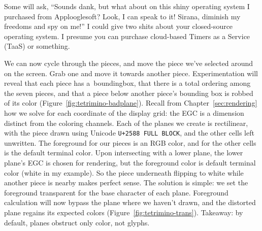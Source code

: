 Some will ask, ``Sounds dank, but what about on this shiny operating system I
purchased from Applooglesoft? Look, I can speak to it! Sirana, diminish my
freedoms and spy on me!'' I could give two shits about your closed-source
operating system. I presume you can purchase cloud-based Timers as a Service
(TaaS) or something.

We can now cycle through the pieces, and move the piece we've selected around
on the screen. Grab one and move it towards another piece. Experimentation will
reveal that each piece has a~\gls{boundingbox}, that there is a total ordering
among the seven pieces, and that a piece below another piece's bounding box is
robbed of its color (Figure~\ref{fig:tetrimino-badplane}). Recall from
Chapter~\ref{sec:rendering} how we solve for each coordinate of the display
grid: the EGC is a dimension distinct from the coloring channels. Each of the
planes we create is rectilinear, with the piece drawn using Unicode
\texttt{U+2588 FULL BLOCK}, and the other cells left unwritten. The foreground
for our pieces is an RGB color, and for the other cells is the default terminal
color. Upon intersecting with a lower plane, the lower plane's EGC is chosen for
rendering, but the foreground color is default terminal color (white in my
example). So the piece underneath flipping to white while another piece is
nearby makes perfect sense. The solution is simple: we set the foreground
transparent for the base character of each plane. Foreground calculation will
now bypass the plane where we haven't drawn, and the distorted plane regains
its expected colors (Figure~\ref{fig:tetrimino-trans}). Takeaway: by default, planes
obstruct only color, not glyphs.

